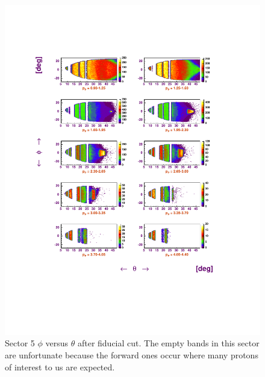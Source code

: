 \begin{figure}[h]
 \begin{center}
 \includegraphics[width = 14cm, bb=60 140 500 660]{img/fid_p_sector5_result}
  \caption[Sector 5 $\phi$ versus $\theta$ after fiducial cut]
          { Sector 5 $\phi$ versus $\theta$ after fiducial cut. The empty bands
	             in this sector are unfortunate because the forward ones occur
		     where many protons of interest to us are expected. }
 \label{fig:fid_p_sector5_result}
 \end{center}
\end{figure}


